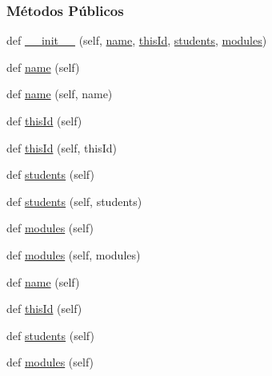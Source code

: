 \subsubsection*{Métodos Públicos}
\begin{DoxyCompactItemize}
\item 
def \hyperlink{classELO_1_1EntityUnit_1_1Courses_ac7ebb87f1edb58776439c56e0626e818}{\+\_\+\+\_\+init\+\_\+\+\_\+} (self, \hyperlink{classELO_1_1EntityUnit_1_1Courses_aeb94f54ad74895834eb7627dd38e1c8e}{name}, \hyperlink{classELO_1_1EntityUnit_1_1Courses_a283b817d129a8d15e3bce56b368a169d}{this\+Id}, \hyperlink{classELO_1_1EntityUnit_1_1Courses_ac8e5e595ec895e03b088764d7506e735}{students}, \hyperlink{classELO_1_1EntityUnit_1_1Courses_a14bdc53eeb2a7fde8e926cbab6e5206f}{modules})
\item 
def \hyperlink{classELO_1_1EntityUnit_1_1Courses_a665fdd852cd9437ce9d6d198481ffa55}{name} (self)
\item 
def \hyperlink{classELO_1_1EntityUnit_1_1Courses_a689c4851ad5c05db001c6aa8c9b52ae5}{name} (self, name)
\item 
def \hyperlink{classELO_1_1EntityUnit_1_1Courses_aff94ff51d3e76f78bf3f74f4ed959820}{this\+Id} (self)
\item 
def \hyperlink{classELO_1_1EntityUnit_1_1Courses_a4edf5f8d32c25b340fc2a31699a162e2}{this\+Id} (self, this\+Id)
\item 
def \hyperlink{classELO_1_1EntityUnit_1_1Courses_a5a263b4fd9457ed3da9727def7a9c00b}{students} (self)
\item 
def \hyperlink{classELO_1_1EntityUnit_1_1Courses_abc319a0cb541a2363e2ccfb7143f3c36}{students} (self, students)
\item 
def \hyperlink{classELO_1_1EntityUnit_1_1Courses_aaf55d9842e50e11a1a9f2bcd065ddfdd}{modules} (self)
\item 
def \hyperlink{classELO_1_1EntityUnit_1_1Courses_ac6786ecc892e78e2ed74c33f9ad1950f}{modules} (self, modules)
\item 
def \hyperlink{classELO_1_1EntityUnit_1_1Courses_a665fdd852cd9437ce9d6d198481ffa55}{name} (self)
\item 
def \hyperlink{classELO_1_1EntityUnit_1_1Courses_aff94ff51d3e76f78bf3f74f4ed959820}{this\+Id} (self)
\item 
def \hyperlink{classELO_1_1EntityUnit_1_1Courses_a5a263b4fd9457ed3da9727def7a9c00b}{students} (self)
\item 
def \hyperlink{classELO_1_1EntityUnit_1_1Courses_aaf55d9842e50e11a1a9f2bcd065ddfdd}{modules} (self)
\end{DoxyCompactItemize}
